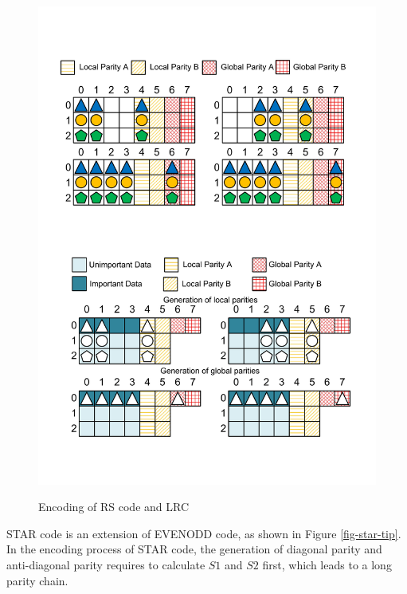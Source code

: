 \documentclass[sigconf]{acmart}
\begin{document}
\begin{figure}
{    \includegraphics[width=0.8\linewidth]{photo/LRC-1.pdf}\label{fig-LRC-1}
}\vspace{-3mm}
\caption{Encoding of RS code and LRC}
\vspace{-3mm}
\end{figure}

STAR code \cite{STAR} is an extension of EVENODD \cite{EVENODD} code, as shown in Figure \ref{fig-star-tip}.
In the encoding process of STAR code, the generation of diagonal parity and anti-diagonal parity requires to calculate $S1$ and $S2$ first, which leads to a long parity chain.
\end{document}
